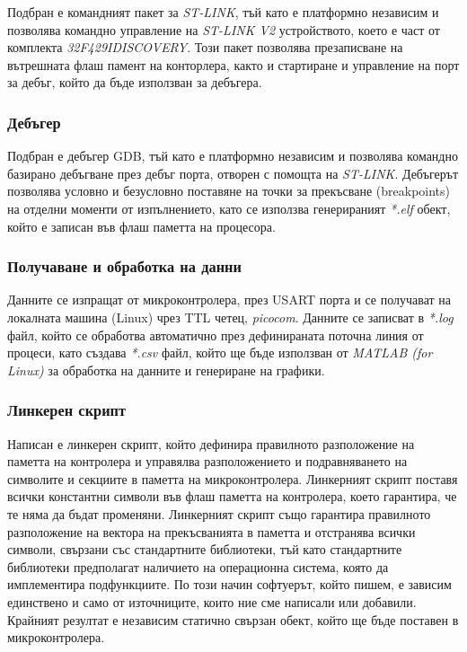 Подбран е командният пакет за \textit{ST-LINK}, тъй като е платформно независим и позволява командно управление на \textit{ST-LINK V2} устройството,
което е част от комплекта \textit{32F429IDISCOVERY}. Този пакет позволява презаписване на вътрешната флаш памент на конторлера,
както и стартиране и управление на порт за дебъг, който да бъде използван за дебъгера.


\subsubsection{Дебъгер}

Подбран е дебъгер GDB, тъй като е платформно независим и позволява командно базирано дебъгване през дебъг порта, отворен с помощта на \textit{ST-LINK}.
Дебъгерът позволява условно и безусловно поставяне на точки за прекъсване (breakpoints) на отделни моменти от изпълнението, 
като се използва генерираният \textit{*.elf} обект,
който е записан във флаш паметта на процесора.

\subsubsection{Получаване и обработка на данни}

Данните се изпращат от микроконтролера, през USART порта и се получават на локалната машина (Linux) чрез TTL четец, \textit{picocom}.
Данните се записват в \textit{*.log} файл, който се обработва автоматично през дефинираната поточна линия от процеси, като създава \textit{*.csv} файл,
който ще бъде използван от \textit{MATLAB (for Linux)} за обработка на данните и генериране на графики.


\subsubsection{Линкерен скрипт}

Написан е линкерен скрипт, който дефинира правилното разположение на паметта на
контролера и управялва разположението и подравняването на символите и секциите в паметта на микроконтролера.
Линкерният скрипт поставя всички константни символи във флаш паметта на контролера, което гарантира, че те няма да бъдат променяни.
Линкерният скрипт също гарантира правилното разположение на вектора на прекъсванията в паметта и отстранява всички символи, свързани със стандартните библиотеки, 
тъй като стандартните библиотеки предполагат наличието на операционна система, 
която да имплементира подфункциите.
По този начин софтуерът, който пишем, е зависим единствено и само от източниците, които ние сме написали или добавили.
Крайният резултат е независим статично свързан обект, който ще бъде поставен в микроконтролера.
